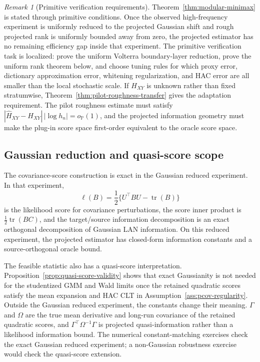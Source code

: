 \documentclass[11pt,a4paper]{amsart}
\theoremstyle{plain}
\theoremstyle{definition}
\theoremstyle{remark}
\newtheorem{remark}[theorem]{Remark}
\DeclareMathOperator{\tr}{tr}
\newcommand{\PP}{\mathbb{P}}
\begin{document}
\begin{remark}[Primitive verification requirements]
Theorem~\ref{thm:modular-minimax} is stated through primitive conditions.  Once the observed
high-frequency experiment is uniformly reduced to the projected Gaussian shift and rough projected
rank is uniformly bounded away from zero, the projected estimator has no remaining efficiency gap
inside that experiment.  The primitive verification task is localized: prove the uniform Volterra
boundary-layer reduction, prove the uniform rank theorem below, and choose tuning rules for which
proxy error, dictionary approximation error, whitening regularization, and HAC error are all smaller
than the local stochastic scale.  If \(H_{XY}\) is unknown rather than fixed stratumwise,
Theorem~\ref{thm:pilot-roughness-transfer} gives the adaptation requirement.  The pilot roughness
estimate must satisfy \(|\widehat H_{XY}-H_{XY}|\,|\log h_n|=o_{\PP}(1)\), and the projected
information geometry must make the plug-in score space first-order equivalent to the oracle score
space.
\end{remark}

\subsection{Gaussian reduction and quasi-score scope}

The covariance-score construction is exact in the Gaussian reduced experiment.  In that experiment,
\[
        \ell(B)=\frac12\{U^\top BU-\tr(B)\}
\]
is the likelihood score for covariance perturbations, the score inner product is
\(\frac12\tr(BC)\), and the target/source information decomposition is an exact orthogonal
decomposition of Gaussian LAN information.  On this reduced experiment, the projected estimator has
closed-form information constants and a source-orthogonal oracle bound.

The feasible statistic also has a quasi-score interpretation.  Proposition~\ref{prop:quasi-score-validity}
shows that exact Gaussianity is not needed for the studentized GMM and Wald limits once the retained
quadratic scores satisfy the mean expansion and HAC CLT in Assumption~\ref{ass:pcov-regularity}.
Outside the Gaussian reduced experiment, the constants change their meaning.  \(\Gamma\) and
\(\Omega\) are the true mean derivative and long-run covariance of the retained quadratic scores,
and \(\Gamma^\top\Omega^{-1}\Gamma\) is projected quasi-information rather than a likelihood
information bound.  The numerical constant-matching exercises check the exact Gaussian reduced
experiment; a non-Gaussian robustness exercise would check the quasi-score extension.
\end{document}
